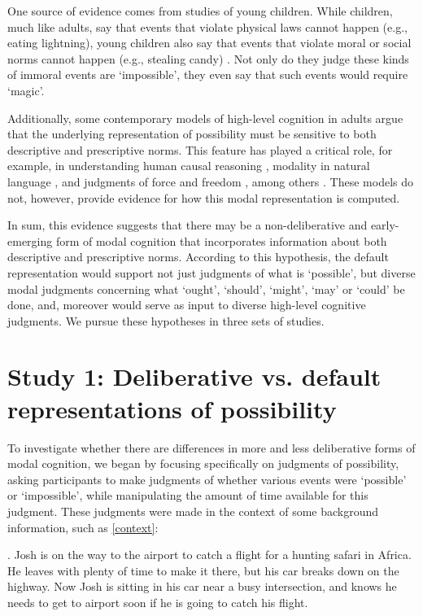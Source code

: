 \documentclass[9pt,twocolumn,twoside]{pnas-new}
\begin{document}
One source of evidence comes from studies of young children. While children, much like adults, say that events that violate physical laws cannot happen (e.g., eating lightning), young children also say that events that violate moral or social norms cannot happen (e.g., stealing candy) \citep{browne2004preschoolers,kalish1998reasons,kushnir2015developing,shtulman2009development,shtulman2007improbable}. Not only do they judge these kinds of immoral events are `impossible', they even say that such events would require `magic'\citep{phillips2016do,shtulman2016differentiating}.

Additionally, some contemporary models of high-level cognition in adults argue that the underlying representation of possibility must be sensitive to both descriptive and prescriptive norms. This feature has played a critical role, for example, in understanding human causal reasoning \cite{halpern2015graded,kominsky2015causal}, modality in natural language \cite{knobe2013modals}, and judgments of force and freedom \cite{young2011paradox}, among others \cite{phillips2015unifying}. These models do not, however, provide evidence for how this modal representation is computed.

In sum, this evidence suggests that there may be a non-deliberative and early-emerging form of modal cognition that incorporates information about both descriptive and prescriptive norms. According to this hypothesis, the default representation would support not just judgments of what is `possible', but diverse modal judgments concerning what `ought', `should', `might', `may' or `could' be done, and, moreover would serve as input to diverse high-level cognitive judgments. We pursue these hypotheses in three sets of studies.

\section*{Study 1: Deliberative vs. default representations of possibility}

To investigate whether there are differences in more and less deliberative forms of modal cognition, we began by focusing specifically on judgments of possibility, asking participants to make judgments of whether various events were `possible' or `impossible', while manipulating the amount of time available for this judgment. These judgments were made in the context of some background information, such as \ref{context}:

\ex. \label{context} Josh is on the way to the airport to catch a flight for a hunting safari in Africa. He leaves with plenty of time to make it there, but his car breaks down on the highway. Now Josh is sitting in his car near a busy intersection, and knows he needs to get to airport soon if he is going to catch his flight.
\end{document}
